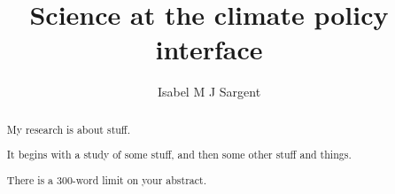
\title{Science at the climate policy interface}
\author{Isabel M J Sargent}

\maketitle

\iffalse
\makedeclaration

\begin{abstract} %
My research is about stuff.

It begins with a study of some stuff, and then some other stuff and things.

There is a 300-word limit on your abstract.
\end{abstract}

